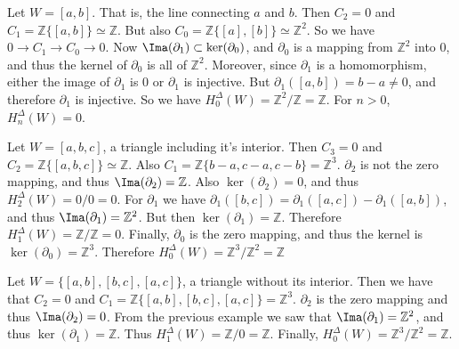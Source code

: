 \documentclass[crop=false,class=book,oneside]{standalone}
\begin{document}
                \begin{example}
                    Let $W=[a,b]$. That is, the line connecting
                    $a$ and $b$. Then $C_{2}=0$ and
                    $C_{1}=\mathbb{Z}\{[a,b]\}\simeq\mathbb{Z}$.
                    But also
                    $C_{0}=\mathbb{Z}\{[a],[b]\}\simeq\mathbb{Z}^{2}$.
                    So we have
                    $0\rightarrow{C_{1}}\rightarrow{C_{0}}\rightarrow0$.
                    Now $\Ima(\partial_{1})\subset\ker(\partial_{0})$,
                    and $\partial_{0}$ is a mapping from
                    $\mathbb{Z}^{2}$ into $0$, and thus the kernel
                    of $\partial_{0}$ is all of $\mathbb{Z}^{2}$.
                    Moreover, since $\partial_{1}$ is a
                    homomorphism, either the image of $\partial_{1}$
                    is $0$ or $\partial_{1}$ is injective. But
                    $\partial_{1}([a,b])=b-a\ne0$, and therefore
                    $\partial_{1}$ is injective. So we have
                    $H_{0}^{\Delta}(W)=\mathbb{Z}^{2}/\mathbb{Z}=\mathbb{Z}$.
                    For $n>0$, $H_{n}^{\Delta}(W)=0$.
                \end{example}
                \begin{example}
                    Let $W=[a,b,c]$, a triangle including it's interior.
                    Then $C_{3}=0$ and
                    $C_{2}=\mathbb{Z}\{[a,b,c]\}\simeq\mathbb{Z}$.
                    Also $C_{1}=\mathbb{Z}\{b-a,c-a,c-b\}=\mathbb{Z}^{3}$.
                    $\partial_{2}$ is not the zero mapping, and thus
                    $\Ima(\partial_{2})=\mathbb{Z}$. Also $\ker(\partial_{2})=0$,
                    and thus $H_{2}^{\Delta}(W)=0/0=0$. For $\partial_{1}$ we have
                    $\partial_{1}([b,c])=\partial_{1}([a,c])-\partial_{1}([a,b])$,
                    and thus $\Ima(\partial_{1})=\mathbb{Z}^{2}$. But then
                    $\ker(\partial_{1})=\mathbb{Z}$. Therefore
                    $H_{1}^{\Delta}(W)=\mathbb{Z}/\mathbb{Z}=0$.
                    Finally, $\partial_{0}$ is the zero mapping, and
                    thus the kernel is $\ker(\partial_{0})=\mathbb{Z}^{3}$.
                    Therefore
                    $H_{0}^{\Delta}(W)=\mathbb{Z}^{3}/\mathbb{Z}^{2}=\mathbb{Z}$
                \end{example}
                \begin{example}
                    Let $W=\{[a,b],[b,c],[a,c]\}$, a triangle without
                    its interior. Then we have that $C_{2}=0$ and
                    $C_{1}=\mathbb{Z}\{[a,b],[b,c],[a,c]\}=\mathbb{Z}^{3}$.
                    $\partial_{2}$ is the zero mapping and thus
                    $\Ima(\partial_{2})=0$. From the previous example
                    we saw that $\Ima(\partial_{1})=\mathbb{Z}^{2}$,
                    and thus $\ker(\partial_{1})=\mathbb{Z}$.
                    Thus $H_{1}^{\Delta}(W)=\mathbb{Z}/0=\mathbb{Z}$.
                    Finally,
                    $H_{0}^{\Delta}(W)=\mathbb{Z}^{3}/\mathbb{Z}^{2}=\mathbb{Z}$.
                \end{example}
\end{document}
